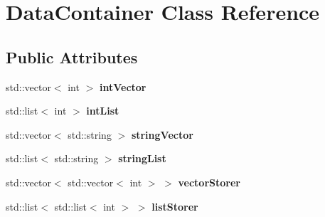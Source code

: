 \hypertarget{class_data_container}{}\section{Data\+Container Class Reference}
\label{class_data_container}
\subsection*{Public Attributes}
\begin{DoxyCompactItemize}
\item 
\hypertarget{class_data_container_af74c56e14aed8ec6ce2fec0f5418dcf7}{}std\+::vector$<$ int $>$ {\bfseries int\+Vector}\label{class_data_container_af74c56e14aed8ec6ce2fec0f5418dcf7}

\item 
\hypertarget{class_data_container_a712129888f1f4b6e269ed261eedad915}{}std\+::list$<$ int $>$ {\bfseries int\+List}\label{class_data_container_a712129888f1f4b6e269ed261eedad915}

\item 
\hypertarget{class_data_container_a5c6bb535f0addf98f9602a797f70a96a}{}std\+::vector$<$ std\+::string $>$ {\bfseries string\+Vector}\label{class_data_container_a5c6bb535f0addf98f9602a797f70a96a}

\item 
\hypertarget{class_data_container_aee42d6af9a30ad208affa5a93c16d181}{}std\+::list$<$ std\+::string $>$ {\bfseries string\+List}\label{class_data_container_aee42d6af9a30ad208affa5a93c16d181}

\item 
\hypertarget{class_data_container_ae06494413373e3bf53c500df556f87fb}{}std\+::vector$<$ std\+::vector$<$ int $>$ $>$ {\bfseries vector\+Storer}\label{class_data_container_ae06494413373e3bf53c500df556f87fb}

\item 
\hypertarget{class_data_container_a0ff7a48ab9020c05f1da6bbe64988e36}{}std\+::list$<$ std\+::list$<$ int $>$ $>$ {\bfseries list\+Storer}\label{class_data_container_a0ff7a48ab9020c05f1da6bbe64988e36}

\end{DoxyCompactItemize}
